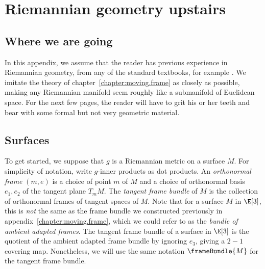 \chapter{Riemannian geometry upstairs}\label{chapter:upstairs}

\section{Where we are going}
In this appendix, we assume that the reader has previous experience in Riemannian geometry, from any of the standard textbooks, for example \cite{doCarmo:1992,Gallot.Hulin.Lafontaine:2004,Milnor:1963,Morgan:1998,ONeill:1983}.
We imitate the theory of chapter~\vref{chapter:moving.frame} as closely as possible, making any Riemannian manifold seem roughly like a submanifold of Euclidean space.
For the next few pages, the reader will have to grit his or her teeth and bear with some formal but not very geometric material.

\section{Surfaces}
To get started, we suppose that \(g\) is a Riemannian metric on a surface \(M\).
For simplicity of notation, write \(g\)-inner products as dot products.
An \emph{orthonormal frame}  \((m,e)\) is a choice of point \(m\) of \(M\) and a choice of orthonormal basis \(e_1, e_2\) of the tangent plane \(T_m M\).
The \emph{tangent frame bundle} of \(M\) is the collection of orthonormal frames of tangent spaces of \(M\).
Note that for a surface \(M\) in \(\E[3]\), this is \emph{not} the same as the frame bundle we constructed previously in appendix~\vref{chapter:moving.frame}, which we could refer to as the \emph{bundle of ambient adapted frames}.
The tangent frame bundle of a surface in \(\E[3]\) is the quotient of the ambient adapted frame bundle by ignoring \(e_3\), giving a \(2-1\) covering map.
Nonetheless, we will use the same notation \(\frameBundle{M}\) for the tangent frame bundle.

